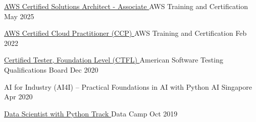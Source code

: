     
    
    

\begin{cvhonors}

  \cvhonor
    {\href{https://www.credly.com/badges/9693dec6-0cad-4171-8118-a33e6453d2c7/public_url}
     {AWS Certified Solutions Architect - Associate \faLink}} %
    {AWS Training and Certification} %
    {} %
    {May 2025} %



  \cvhonor
    {\href{https://www.credly.com/badges/bbc12013-be20-42f8-a2e3-2b2ef25c25d8/public_url}
     {AWS Certified Cloud Practitioner (CCP) \faLink}} %
    {AWS Training and Certification} %
    {} %
    {Feb 2022} %

  \cvhonor
    {\href{https://atsqa.org/certified-testers/profile/d2cc95a248f74c738c9516a6760948df}
     {Certified Tester, Foundation Level (CTFL) \faLink}} %
    {American Software Testing Qualifications Board} %
    {} %
    {Dec 2020} %

\cvhonor
    {AI for Industry (AI4I) – Practical Foundations in AI with Python} %
    {AI Singapore} %
    {} %
    {Apr 2020} %

  \cvhonor
    {\href{https://www.datacamp.com/statement-of-accomplishment/track/c42c3d3f2b1a68b0c774b613a7e1bbae7e2b13b5}{Data Scientist with Python Track \faLink }} %
    {Data Camp} %
    {} %
    {Oct 2019} %

\end{cvhonors}